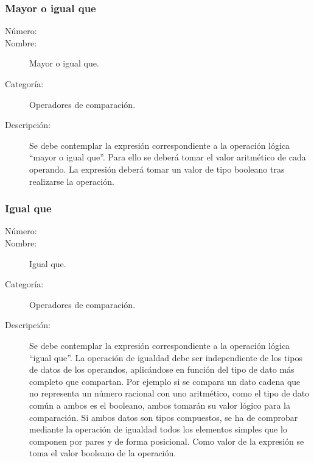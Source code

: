 \subsubsection{Mayor o igual que}
\begin{framed}
	\begin{description}
		\item [Número:] \cn
		\item [Nombre:] Mayor o igual que.
		\item [Categoría:] Operadores de comparación.
		\item [Descripción:] Se debe contemplar la expresión correspondiente a la operación lógica ``mayor o igual que''. Para ello se deberá tomar
		el valor aritmético de cada operando. La expresión deberá tomar un valor de tipo booleano tras realizarse la operación.
	\end {description}
\end{framed}

\subsubsection{Igual que}
\begin{framed}
	\begin{description}
		\item [Número:] \cn
		\item [Nombre:] Igual que.
		\item [Categoría:] Operadores de comparación.
		\item [Descripción:] Se debe contemplar la expresión correspondiente a la operación lógica ``igual que''. La operación de igualdad
		debe ser independiente de los tipos de datos de los operandos, aplicándose en función del tipo de dato más completo que compartan.
		Por ejemplo si se compara un dato cadena que no representa un número racional con uno aritmético, como el tipo de dato común a ambos
		es el booleano, ambos tomarán su valor lógico para la comparación.  
		Si ambos datos son tipos compuestos, se ha de comprobar mediante la operación de igualdad todos los elementos simples que lo componen
		por pares y de forma posicional.
		Como valor de la expresión se toma el valor booleano de la operación.
	\end {description}
\end{framed}

